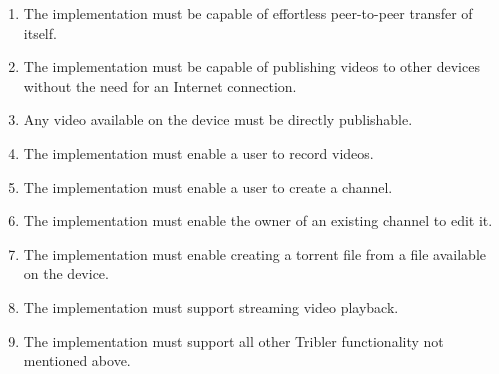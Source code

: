 \begin{enumerate}[label=A\arabic*.,ref=A\arabic*]
	
	\item \label{rq:BeamApp} The implementation must be capable of effortless peer-to-peer transfer of itself.
	\item \label{rq:PublishOffline} The implementation must be capable of publishing videos to other devices without the need for an Internet connection.
	\item \label{rq:PublishAny} Any video available on the device must be directly publishable. %
	\item \label{rq:Rec} The implementation must enable a user to record videos.
	\item \label{rq:MyChannelCreate} The implementation must enable a user to create a channel.
	\item \label{rq:MyChannelEdit} The implementation must enable the owner of an existing channel to edit it.
	\item \label{rq:CreateTorrent} The implementation must enable creating a torrent file from a file available on the device.
	\item \label{rq:StreamingVideo} The implementation must support streaming video playback.
	\item \label{rq:AllTribler} The implementation must support all other Tribler functionality not mentioned above.
	
\end{enumerate}



